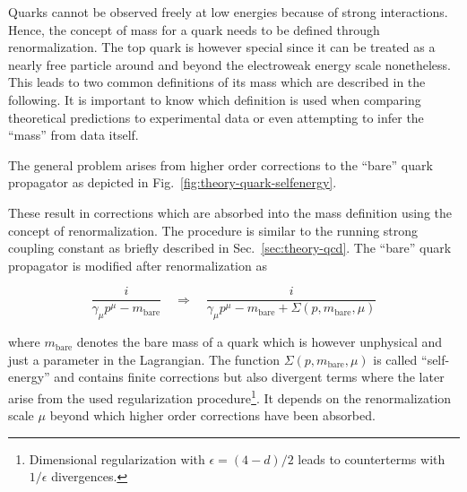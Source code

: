 Quarks cannot be observed freely at low energies because of strong interactions. Hence, the concept of mass for a quark needs to be defined through renormalization. The top quark is however special since it can be treated as a nearly free particle around and beyond the electroweak energy scale nonetheless. This leads to two common definitions of its mass which are described in the following. It is important to know which definition is used when comparing theoretical predictions to experimental data or even attempting to infer the ``mass'' from data itself.

The general problem arises from higher order corrections to the ``bare'' quark propagator as depicted in Fig.~\ref{fig:theory-quark-selfenergy}. 


These result in corrections which are absorbed into the mass definition using the concept of renormalization. The procedure is similar to the running strong coupling constant as briefly described in Sec.~\ref{sec:theory-qcd}. The ``bare'' quark propagator is modified after renormalization as

\begin{equation}
\frac{i}{\gamma_{\mu}p^{\mu}-m_\mathrm{bare}}\quad\Rightarrow\quad\frac{i}{\gamma_{\mu}p^{\mu}-m_\mathrm{bare}+\Sigma(p,m_\mathrm{bare},\mu)}
\end{equation}

where $m_\mathrm{bare}$ denotes the bare mass of a quark which is however unphysical and just a parameter in the Lagrangian. The function $\Sigma(p,m_\mathrm{bare},\mu)$ is called ``self-energy'' and contains finite corrections but also divergent terms where the later arise from the used regularization procedure\footnote{Dimensional regularization with $\epsilon=(4-d)/2$ leads to counterterms with $1/\epsilon$ divergences.}. It depends on the renormalization scale $\mu$ beyond which higher order corrections have been absorbed.

